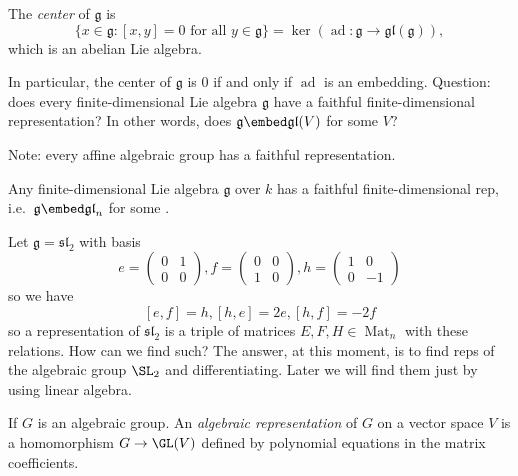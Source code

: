\documentclass[a4paper]{article}
\DeclareMathOperator{\Mat}{Mat}
\newcommand*{\Lie}[1]{\mathfrak{#1}} %
\DeclareMathOperator{\ad}{ad} %
\begin{document}
\begin{definition}[center]
  The \emph{center} of \(\Lie g\) is
  \[
    \{x \in \Lie g: [x, y] = 0 \text{ for all } y \in \Lie g\} = \ker (\ad: \Lie g \to \Lie{gl}(\Lie g)),
  \]
  which is an abelian Lie algebra.
\end{definition}

In particular, the center of \(\Lie g\) is \(0\) if and only if \(\ad\) is an embedding. Question: does every finite-dimensional Lie algebra \(\Lie g\) have a faithful finite-dimensional representation? In other words, does \(\Lie g \embed \Lie{gl}(V)\) for some \(V\)?

Note: every affine algebraic group has a faithful representation.

\begin{theorem}[Ado]
  Any finite-dimensional Lie algebra \(\Lie g\) over \(k\) has a faithful finite-dimensional rep, i.e.\ \(\Lie g \embed \Lie{gl}_n\) for some \(.\)
\end{theorem}

\begin{eg}
  Let \(\Lie g = \Lie{sl}_2\) with basis
  \[
    e =
    \begin{pmatrix}
      0 & 1 \\
      0 & 0
    \end{pmatrix},
    f =
    \begin{pmatrix}
      0 & 0 \\
      1 & 0
    \end{pmatrix},
    h =
    \begin{pmatrix}
      1 & 0 \\
      0 & -1
    \end{pmatrix}
  \]
  so we have
  \[
    [e, f] = h,
    [h, e] = 2e,
    [h, f] = -2f
  \]
  so a representation of \(\Lie{sl}_2\) is a triple of matrices \(E, F, H \in \Mat_n\) with these relations. How can we find such? The answer, at this moment, is to find reps of the algebraic group \(\SL_2\) and differentiating. Later we will find them just by using linear algebra.
\end{eg}

\begin{definition}
  If \(G\) is an algebraic group. An \emph{algebraic representation} of \(G\) on a vector space \(V\) is a homomorphism \(G \to \GL(V)\) defined by polynomial equations in the matrix coefficients.
\end{definition}
\end{document}
